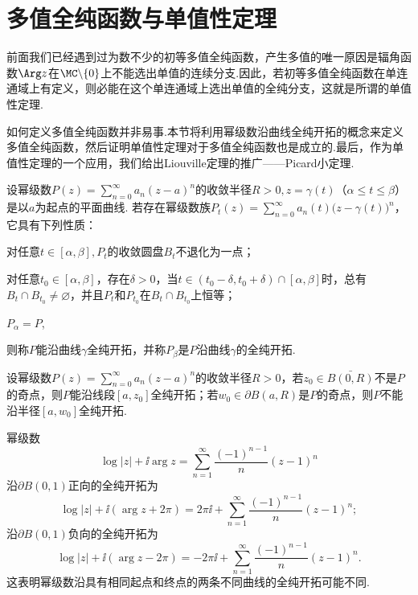 \section{多值全纯函数与单值性定理\label{sec6.3}}

前面我们已经遇到过为数不少的初等多值全纯函数，产生多值的唯一原因是辐角函数$\Arg z$在$\MC\backslash\{0\}$上不能选出单值的连续分支.因此，若初等多值全纯函数在单连通域上有定义，则必能在这个单连通域上选出单值的全纯分支，这就是所谓的单值性定理.

如何定义多值全纯函数并非易事.本节将利用幂级数沿曲线全纯开拓的概念来定义多值全纯函数，然后证明单值性定理对于多值全纯函数也是成立的.最后，作为单值性定理的一个应用，我们给出Liouville定理的推广——Picard小定理.
\begin{definition}\label{def6.3.1}
设幂级数$P(z)=\sum_{n=0}^\infty a_n(z-a)^n$的收敛半径$R>0,z=\gamma(t)$（$\alpha\le t\le \beta$）是以$a$为起点的平面曲线. 若存在幂级数族$P_t(z)=\sum_{n=0}^\infty a_n(t)\big(z-\gamma(t)\big)^n$，它具有下列性质：
\begin{eenum}
  \item 对任意$t\in[\alpha,\beta],P_t$的收敛圆盘$B_t$不退化为一点；
  \item 对任意$t_0\in[\alpha,\beta]$，存在$\delta>0$，当$t\in(t_0-\delta,t_0+\delta)\cap[\alpha,\beta]$时，总有$B_t\cap B_{t_0}\ne\varnothing$，并且$P_t$和$P_{t_0}$在$B_t\cap B_{t_0}$上恒等；
  \item $P_\alpha=P$,
\end{eenum}
则称$P$能沿曲线$\gamma$全纯开拓，并称$P_\beta$是$P$沿曲线$\gamma$的全纯开拓.
\end{definition}

\begin{example}\label{exam6.3.2}
设幂级数$P(z)=\sum_{n=0}^\infty a_n(z-a)^n$的收敛半径$R>0$，若$z_0\in\bar{B(0,R)}$不是$P$的奇点，则$P$能沿线段$[a,z_0]$全纯开拓；若$w_0\in\partial B(a,R)$是$P$的奇点，则$P$不能沿半径$[a,w_0]$全纯开拓.
\end{example}

\begin{example}\label{exam6.3.3}
幂级数
\[\log|z|+\ii\arg z=\sum_{n=1}^\infty\frac{(-1)^{n-1}}n(z-1)^n\]
沿$\partial B(0,1)$正向的全纯开拓为
\[\log|z|+\ii(\arg z+2\pi)=2\pi\ii+\sum_{n=1}^\infty\frac{(-1)^{n-1}}n(z-1)^n;\]
沿$\partial B(0,1)$负向的全纯开拓为
\[\log|z|+\ii(\arg z-2\pi)=-2\pi\ii+\sum_{n=1}^\infty\frac{(-1)^{n-1}}n(z-1)^n.\]
这表明幂级数沿具有相同起点和终点的两条不同曲线的全纯开拓可能不同.
\end{example}

